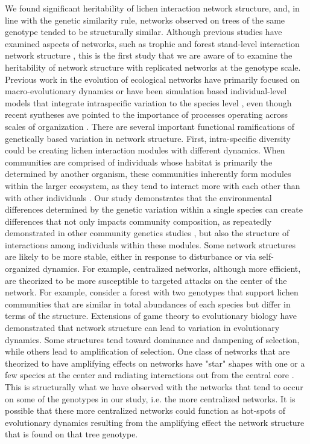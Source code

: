 \documentclass[11pt,twocolumn,twoside,lineno]{pnas-new}
\begin{document}
We found significant heritability of lichen interaction network
structure, and, in line with the genetic similarity rule, networks
observed on trees of the same genotype tended to be structurally
similar. Although previous studies have examined aspects of networks,
such as trophic \cite{Barbour2019TraitCommunities} and forest
stand-level interaction network structure
\cite{Lau2016GenotypicEvolution, Keith2017}, this is the first study
that we are aware of to examine the heritability of network structure
with replicated networks at the genotype scale. Previous work in the
evolution of ecological networks have primarily focused on
macro-evolutionary dynamics \cite{Rezende2007, Weber2017,
  Valverde2018, Harmon2019} or have been simulation based
individual-level models that integrate intraspecific variation to the
species level \cite{Maliet2020}, even though recent syntheses ave
pointed to the importance of processes operating across scales of
organization \cite{Guimaraes2020}. There are several important
functional ramifications of genetically based variation in network
structure. First, intra-specific diversity could be creating lichen
interaction modules with different dynamics. When communities are
comprised of individuals whose habitat is primarily the determined by
another organism, these communities inherently form modules within the
larger ecosystem, as they tend to interact more with each other than
with other individuals \cite{Fortuna2009, Lau2017, OTHERS}. Our study
demonstrates that the environmental differences determined by the
genetic variation within a single species can create differences that
not only impacts community composition, as repeatedly demonstrated in
other community genetics studies \cite{Whitham2006,
  DesRoches2018TheVariation}, but also the structure of interactions
among individuals within these modules.  Some network structures are
likely to be more stable, either in response to disturbance or via
self-organized dynamics. For example, centralized networks, although
more efficient, are theorized to be more susceptible to targeted
attacks on the center of the network. For example, consider a forest
with two genotypes that support lichen communities that are similar in
total abundances of each species but differ in terms of the
structure. Extensions of game theory to evolutionary biology have
demonstrated that network structure can lead to variation in
evolutionary dynamics. Some structures tend toward dominance and
dampening of selection, while others lead to amplification of
selection. One class of networks that are theorized to have amplifying
effects on networks have "star" shapes with one or a few species at
the center and radiating interactions out from the central core
\cite{Lleberman2005EvolutionaryGraphs}. This is structurally what we
have observed with the networks that tend to occur on some of the
genotypes in our study, i.e. the more centralized networks. It is
possible that these more centralized networks could function as
hot-spots of evolutionary dynamics resulting from the amplifying
effect the network structure that is found on that tree genotype.
\end{document}
